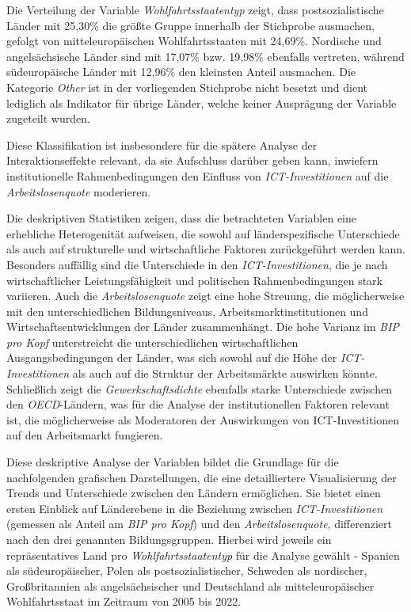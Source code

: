 

Die Verteilung der Variable \textit{Wohlfahrtsstaatentyp} zeigt, dass postsozialistische Länder 
mit 25,30\% die größte Gruppe innerhalb der Stichprobe ausmachen, gefolgt von mitteleuropäischen 
Wohlfahrtsstaaten mit 24,69\%. Nordische und angelsächsische Länder sind mit 17,07\% bzw. 19,98\% 
ebenfalls vertreten, während südeuropäische Länder mit 12,96\% den kleinsten Anteil ausmachen. 
Die Kategorie \textit{Other} ist in der vorliegenden Stichprobe nicht besetzt und dient lediglich 
als Indikator für übrige Länder, welche keiner Ausprägung der Variable zugeteilt wurden.

Diese Klassifikation ist insbesondere für die spätere Analyse der Interaktionseffekte relevant, 
da sie Aufschluss darüber geben kann, inwiefern institutionelle Rahmenbedingungen den Einfluss 
von \textit{\ac{ICT}-Investitionen} auf die \textit{Arbeitslosenquote} moderieren.

Die deskriptiven Statistiken zeigen, dass die betrachteten Variablen eine erhebliche 
Heterogenität aufweisen, die sowohl auf länderspezifische Unterschiede als auch auf strukturelle 
und wirtschaftliche Faktoren zurückgeführt werden kann. Besonders auffällig sind die Unterschiede 
in den \textit{\ac{ICT}-Investitionen}, die je nach wirtschaftlicher Leistungsfähigkeit und 
politischen Rahmenbedingungen stark variieren. Auch die \textit{Arbeitslosenquote} zeigt eine 
hohe Streuung, die möglicherweise mit den unterschiedlichen Bildungsniveaus, 
Arbeitsmarktinstitutionen und Wirtschaftsentwicklungen der Länder zusammenhängt. Die hohe Varianz 
im \textit{\ac{BIP} pro Kopf} unterstreicht die unterschiedlichen wirtschaftlichen 
Ausgangsbedingungen der Länder, was sich sowohl auf die Höhe der \textit{\ac{ICT}-Investitionen} 
als auch auf die Struktur der Arbeitsmärkte auswirken könnte. Schließlich zeigt die 
\textit{Gewerkschaftsdichte} ebenfalls starke Unterschiede zwischen den \textit{OECD}-Ländern, 
was für die Analyse der institutionellen Faktoren relevant ist, die möglicherweise als 
Moderatoren der Auswirkungen von \ac{ICT}-Investitionen auf den Arbeitsmarkt fungieren.

Diese deskriptive Analyse der Variablen bildet die Grundlage für die nachfolgenden grafischen 
Darstellungen, die eine detailliertere Visualisierung der Trends und Unterschiede zwischen den 
Ländern ermöglichen. Sie bietet einen ersten Einblick auf Länderebene in die Beziehung zwischen 
\textit{\ac{ICT}-Investitionen} (gemessen als Anteil am \textit{\ac{BIP} pro Kopf}) und den 
\textit{Arbeitslosenquote}, differenziert nach den drei genannten Bildungsgruppen. Hierbei wird 
jeweils ein repräsentatives Land pro \textit{Wohlfahrtsstaatentyp} für die Analyse gewählt - 
Spanien als südeuropäischer, Polen als postsozialistischer, Schweden als nordischer, 
Großbritannien als angelsächsischer und Deutschland als mitteleuropäischer Wohlfahrtsstaat im 
Zeitraum von 2005 bis 2022. 

